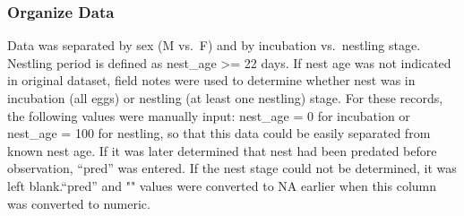 \documentclass[]{article}
\begin{document}
\hypertarget{organize-data}{%
\subsubsection{Organize Data}\label{organize-data}}

Data was separated by sex (M vs.~F) and by incubation vs.~nestling
stage. Nestling period is defined as nest\_age \textgreater{}= 22 days.
If nest age was not indicated in original dataset, field notes were used
to determine whether nest was in incubation (all eggs) or nestling (at
least one nestling) stage. For these records, the following values were
manually input: nest\_age = 0 for incubation or nest\_age = 100 for
nestling, so that this data could be easily separated from known nest
age. If it was later determined that nest had been predated before
observation, ``pred'' was entered. If the nest stage could not be
determined, it was left blank.``pred'' and "" values were converted to
NA earlier when this column was converted to numeric.
\end{document}
